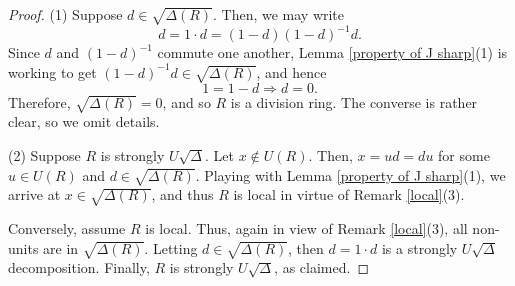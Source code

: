 \documentclass[10pt,a4paper]{amsart}
\begin{document}
\begin{proof}
(1) Suppose $d \in \sqrt{\Delta(R)}$. Then, we may write
\[
			d = 1 \cdot d = (1 - d)(1 - d)^{-1}d.
\]
Since $d$ and $(1 - d)^{-1}$ commute one another, Lemma \ref{property of J sharp}(1) is working to get $(1 - d)^{-1}d \in \sqrt{\Delta(R)}$, and hence
	\[
			1 = 1 - d \Rightarrow d = 0.
	\]
Therefore, $\sqrt{\Delta(R)} = 0$, and so $R$ is a division ring. The converse is rather clear, so we omit details.
			
(2) Suppose $R$ is strongly $U\sqrt{\Delta}$. Let $x \notin U(R)$. Then, $x = ud = du$ for some $u \in U(R)$ and $d \in \sqrt{\Delta(R)}$. Playing with Lemma \ref{property of J sharp}(1), we arrive at $x \in \sqrt{\Delta(R)}$, and thus $R$ is local in virtue of Remark \ref{local}(3).
			
Conversely, assume $R$ is local. Thus, again in view of Remark \ref{local}(3), all non-units are in $\sqrt{\Delta(R)}$. Letting $d \in \sqrt{\Delta(R)}$, then $d = 1 \cdot d$ is a strongly $U\sqrt{\Delta}$ decomposition. Finally, $R$ is strongly $U\sqrt{\Delta}$, as claimed.
\end{proof}
\end{document}

